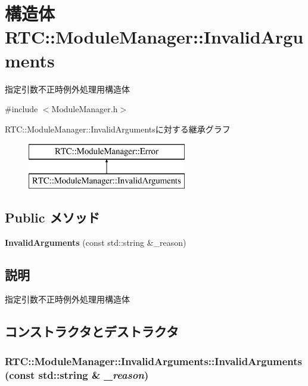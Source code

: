 \section{構造体 RTC::ModuleManager::InvalidArguments}
\label{structRTC_1_1ModuleManager_1_1InvalidArguments}


指定引数不正時例外処理用構造体  




{\ttfamily \#include $<$ModuleManager.h$>$}

RTC::ModuleManager::InvalidArgumentsに対する継承グラフ\begin{figure}[H]
\begin{center}
\leavevmode
\includegraphics[height=2cm]{structRTC_1_1ModuleManager_1_1InvalidArguments}
\end{center}
\end{figure}
\subsection*{Public メソッド}
\begin{DoxyCompactItemize}
\item 
{\bf InvalidArguments} (const std::string \&\_\-reason)
\end{DoxyCompactItemize}


\subsection{説明}
指定引数不正時例外処理用構造体 

\subsection{コンストラクタとデストラクタ}
\subsubsection[{InvalidArguments}]{\setlength{\rightskip}{0pt plus 5cm}RTC::ModuleManager::InvalidArguments::InvalidArguments (const std::string \& {\em \_\-reason})\hspace{0.3cm}{\ttfamily  [inline]}}\label{structRTC_1_1ModuleManager_1_1InvalidArguments_a4fc5572f3222647ebebc44121c7236ed}
